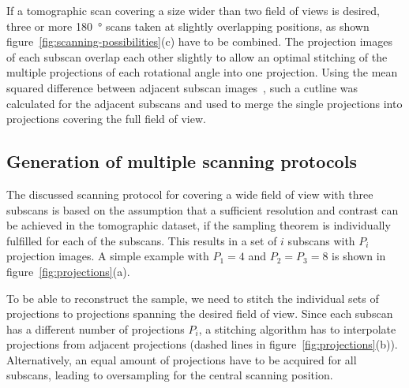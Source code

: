 If a tomographic scan covering a size wider than two field of views is desired, three or more \SI{180}{\degree} scans taken at slightly overlapping positions, as shown figure~\ref{fig:scanning-possibilities}(c) have to be combined. The projection images of each subscan overlap each other slightly to allow an optimal stitching of the multiple projections of each rotational angle into one projection. Using the mean squared difference between adjacent subscan images~\cite{Hintermueller2009}, such a cutline was calculated for the adjacent subscans and used to merge the single projections into projections covering the full field of view.

\subsection{Generation of multiple scanning protocols}%
The discussed scanning protocol for covering a wide field of view with three subscans is based on the assumption that a sufficient resolution and contrast can be achieved in the tomographic dataset, if the sampling theorem is individually fulfilled for each of the subscans. This results in a set of $i$ subscans with $P_{i}$ projection images. A simple example with $P_{1}=4$ and $P_{2}=P_{3}=8$ is shown in figure~\ref{fig:projections}(a).

To be able to reconstruct the sample, we need to stitch the individual sets of projections to projections spanning the desired field of view. Since each subscan has a different number of projections $P_{i}$, a stitching algorithm has to interpolate projections from adjacent projections (dashed lines in figure~\ref{fig:projections}(b)). Alternatively, an equal amount of projections have to be acquired for all subscans, leading to oversampling for the central scanning position.

